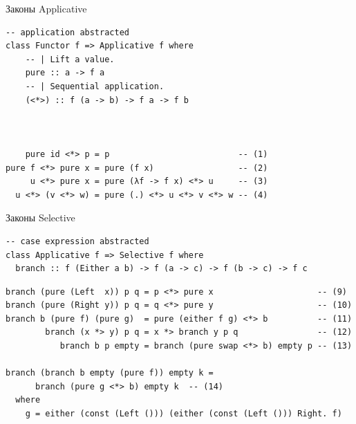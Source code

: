 \documentclass[aspectratio=169
  , xcolor={svgnames}
  , hyperref={ colorlinks,citecolor=Blue
             , linkcolor=DarkRed,urlcolor=DarkBlue}
  , usenames, dvipsnames
  , russian
  ]{beamer}
\begin{document}


\begin{frame}[fragile]{Законы Applicative}
\begin{verbatim}
-- application abstracted 
class Functor f => Applicative f where
    -- | Lift a value.
    pure :: a -> f a
    -- | Sequential application.
    (<*>) :: f (a -> b) -> f a -> f b



    pure id <*> p = p                          -- (1)
pure f <*> pure x = pure (f x)                 -- (2)
     u <*> pure x = pure (λf -> f x) <*> u     -- (3)
  u <*> (v <*> w) = pure (.) <*> u <*> v <*> w -- (4)
\end{verbatim}
\end{frame}



\begin{frame}[fragile]{Законы Selective}
\begin{verbatim}
-- case expression abstracted
class Applicative f => Selective f where
  branch :: f (Either a b) -> f (a -> c) -> f (b -> c) -> f c
\end{verbatim}
\newln 

\begin{verbatim}
branch (pure (Left  x)) p q = p <*> pure x                     -- (9)
branch (pure (Right y)) p q = q <*> pure y                     -- (10)
branch b (pure f) (pure g)  = pure (either f g) <*> b          -- (11)
        branch (x *> y) p q = x *> branch y p q                -- (12)
           branch b p empty = branch (pure swap <*> b) empty p -- (13)
           
branch (branch b empty (pure f)) empty k = 
      branch (pure g <*> b) empty k  -- (14)
  where
    g = either (const (Left ())) (either (const (Left ())) Right. f) 
\end{verbatim}

\end{frame}
\end{document}
